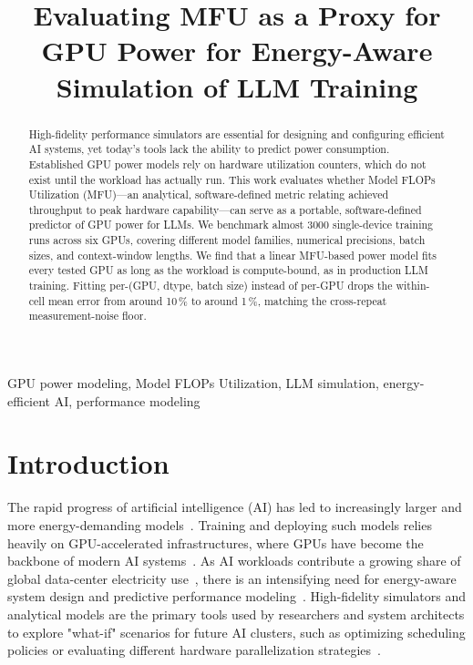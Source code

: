 \documentclass[10pt,conference,letterpaper]{IEEEtran}
\begin{document}
\title{Evaluating MFU as a Proxy for GPU Power for Energy-Aware Simulation of LLM Training}

\author{
\and
{}
}

\maketitle

\begin{abstract}
High-fidelity performance simulators are essential for designing and configuring efficient AI systems, yet today's tools lack the ability to predict power consumption.
Established GPU power models rely on hardware utilization counters, which do not exist until the workload has actually run.
This work evaluates whether Model FLOPs Utilization (MFU)---an analytical, software-defined metric relating achieved throughput to peak hardware capability---can serve as a portable, software-defined predictor of GPU power for LLMs.
We benchmark almost 3000 single-device training runs across six GPUs, covering different model families, numerical precisions, batch sizes, and context-window lengths.
We find that a linear MFU-based power model fits every tested GPU as long as the workload is compute-bound, as in production LLM training.
Fitting per-(GPU, dtype, batch size) instead of per-GPU drops the within-cell mean error from around 10\,\% to around 1\,\%, matching the cross-repeat measurement-noise floor.
\end{abstract}

\begin{IEEEkeywords}
GPU power modeling, Model FLOPs Utilization, LLM simulation, energy-efficient AI, performance modeling
\end{IEEEkeywords}

\section{Introduction}
The rapid progress of artificial intelligence (AI) has led to increasingly larger and more energy-demanding models~\cite{yang-2024B}.
Training and deploying such models relies heavily on GPU-accelerated infrastructures, where GPUs have become the backbone of modern AI systems~\cite{jahanshahi-2020}.
As AI workloads contribute a growing share of global data-center electricity use~\cite{international-energy-agency-2025}, there is an intensifying need for energy-aware system design and predictive performance modeling~\cite{katsenou-2024, google-2024}.
High-fidelity simulators and analytical models are the primary tools used by researchers and system architects to explore "what-if" scenarios for future AI clusters, such as optimizing scheduling policies or evaluating different hardware parallelization strategies~\cite{agrawal2024vidur, simumax, zhebrak2026llmclustersim}.
\end{document}
